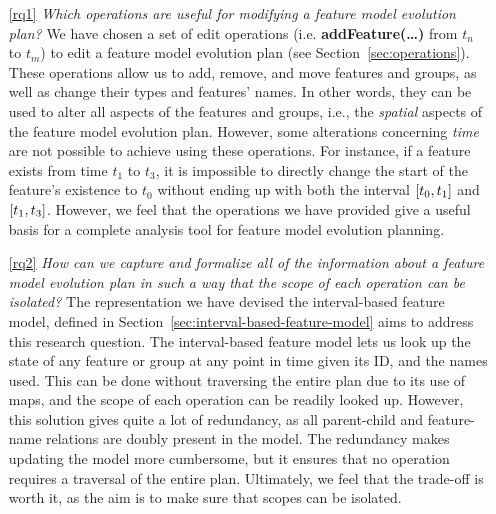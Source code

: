 \begin{enumerate}

   \item[\ref{rq1}] \textit{Which operations are useful for modifying a feature model evolution plan?} 
      We have chosen a set of edit operations (i.e. \textbf{addFeature(\ldots)} from ${t_n}$ to ${t_m}$) to edit a feature model evolution plan (see Section~\vref{sec:operations}). These operations allow us to add, remove, and move features and groups, as well as change their types and features' names. In other words, they can be used to alter all aspects of the features and groups, i.e., the \emph{spatial} aspects of the feature model evolution plan. However, some alterations concerning \emph{time} are not possible to achieve using these operations. For instance, if a feature exists from time $t_1$ to $t_3$, it is impossible to directly change the start of the feature's existence to $t_0$ without ending up with both the interval $\interval{t_0}{t_1}$ and $\interval{t_1}{t_3}$. However, we feel that the operations we have provided give a useful basis for a complete analysis tool for feature model evolution planning. 

   \item[\ref{rq2}]\textit{How can we capture and formalize all of the information about a feature model evolution plan in such a way that the scope of each operation can be isolated?} 
      The representation we have devised \textemdash{} the interval-based feature model, defined in Section~\vref{sec:interval-based-feature-model} \textemdash{} aims to address this research question. The interval-based feature model lets us look up the state of any feature or group at any point in time given its ID, and the names used. This can be done without traversing the entire plan due to its use of maps, and the scope of each operation can be readily looked up. However, this solution gives quite a lot of redundancy, as all parent-child and feature-name relations are doubly present in the model. The redundancy makes updating the model more cumbersome, but it ensures that no operation requires a traversal of the entire plan. Ultimately, we feel that the trade-off is worth it, as the aim is to make sure that scopes can be isolated.


\end{enumerate}
